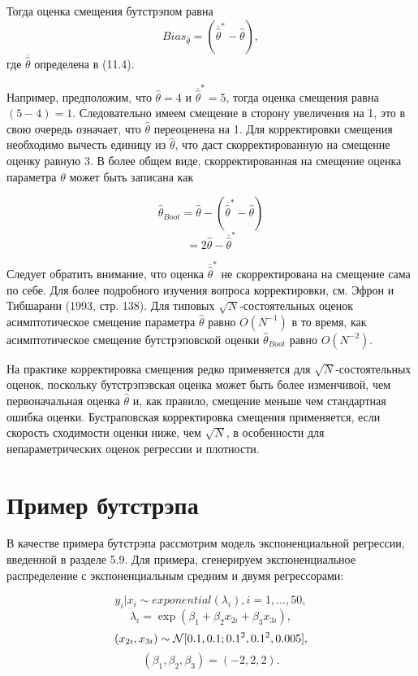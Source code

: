 Тогда оценка смещения бутстрэпом равна
\begin{equation}
Bias_{\hat{\theta}}=(\overline{\hat{\theta}}^*-\hat{\theta}),
\end{equation}
где $\overline{\hat{\theta}}$ определена в (11.4).

Например, предположим, что $\hat{\theta}=4$ и $\overline{\hat{\theta}}^*=5$, тогда оценка смещения равна $(5-4)=1$. Следовательно имеем смещение в сторону увеличения на 1, это в свою очередь означает, что $\hat{\theta}$ переоценена на 1. Для корректировки смещения необходимо вычесть единицу из $\hat{\theta}$, что даст скорректированную на смещение оценку равную 3. В более общем виде, скорректированная на смещение оценка параметра $\theta$ может быть записана как

\begin{equation}
\hat{\theta}_{Boot}=\hat{\theta}-(\overline{\hat{\theta}}^*-\hat{\theta})
\end{equation}
\[
=2\hat{\theta}-\overline{\hat{\theta}}^*
\]

Следует обратить внимание, что оценка $\overline{\hat{\theta}}^*$ не скорректирована на смещение сама по себе. Для более подробного изучения вопроса корректировки, см. Эфрон и Тибшарани (1993, стр. 138). Для типовых $\sqrt{N}$-состоятельных оценок асимптотическое смещение параметра $\hat{\theta}$ равно $O(N^{-1})$ в то время, как асимптотическое смещение бутстрэповской оценки $\hat{\theta}_{Boot}$ равно $O(N^{-2})$.

На практике корректировка смещения редко применяется для $\sqrt{N}$-состоятельных оценок, поскольку бутстрэпэвская оценка может быть более изменчивой, чем первоначальная оценка $\hat{\theta}$ и, как правило, смещение меньше чем стандартная ошибка оценки. Бустраповская корректировка смещения  применяется, если скорость сходимости оценки ниже, чем $\sqrt{N}$, в особенности для непараметрических оценок регрессии и  плотности.

\section{Пример бутстрэпа}

В качестве примера бутстрэпа рассмотрим модель экспоненциальной регрессии, введенной в разделе 5.9. Для  примера,  сгенерируем экспоненциальное распределение с экспоненциальным средним и двумя регрессорами:

\[
y_i|x_i\sim exponential(\lambda_i), i=1,\ldots ,50,
\]
\[
\lambda_i= \exp(\beta_1+\beta_{2}x_{2i}+\beta_{3}x_{3i}),
\]
\[
(x_{2i},x_{3i})\sim \mathcal{N}[0.1,0.1;0.1^2,0.1^2,0.005],
\]
\[
(\beta_1,\beta_2,\beta_3)=(-2,2,2).
\]

